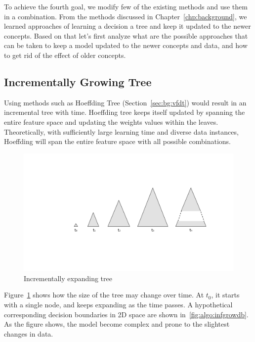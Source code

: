 To achieve the fourth goal, we modify few of the existing methods and use them in a combination. From the methods discussed in Chapter~\ref{chp:background}, we learned approaches of learning a decision a tree and keep it updated to the newer concepts. Based on that let's first analyze what are the possible approaches that can be taken to keep a model updated to the newer concepts and data, and how to get rid of the effect of older concepts.

\subsection{Incrementally Growing Tree}
Using methods such as Hoeffding Tree (Section~\ref{sec:bg:vfdt}) would result in an incremental tree with time. Hoeffding tree keeps itself updated by spanning the entire feature space and updating the weights values within the leaves. Theoretically, with sufficiently large learning time and diverse data instances, Hoeffding will span the entire feature space with all possible combinations.

\begin{figure}[htbp]
    \begin{center}
        \includegraphics[width=14.0cm]{figs/infgrow.pdf}
        \caption{Incrementally expanding tree}
        \label{fig:algo:infgrow}
    \end{center}
\end{figure}

Figure~\ref{fig:algo:infgrow} shows how the size of the tree may change over time. At $t_0$, it starts with a single node, and keeps expanding as the time passes. A hypothetical corresponding decision boundaries in 2D space are shown in~\ref{fig:algo:infgrowdb}. As the figure shows, the model become complex and prone to the slightest changes in data.


